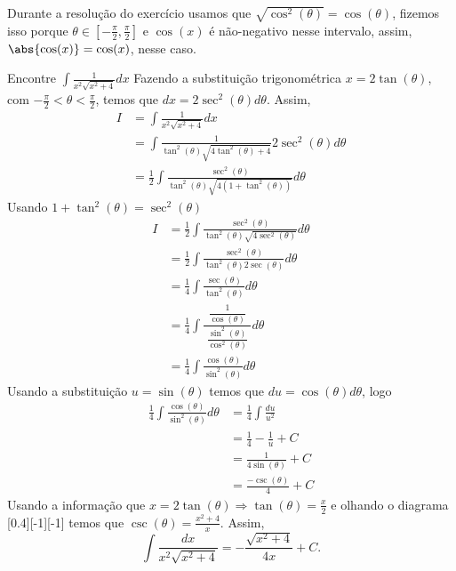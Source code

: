 Durante a resolução do exercício usamos que
\(\sqrt{\cos^2(\theta)}=\cos(\theta)\),
fizemos isso porque
\(\theta \in \left[-\frac{\pi}{2}, \frac{\pi}{2} \right]\)
e $\cos(x)$ é não-negativo nesse intervalo, assim,
$\abs{\cos(x)}= \cos(x)$, nesse caso.

\begin{example}
  Encontre \(\int \frac{1}{x^2\sqrt{x^2+4}}dx\)
  \solution
  Fazendo a substituição trigonométrica
  $x=2\tan(\theta)$, com $-\frac{\pi}{2}< \theta < \frac{\pi}{2}$,
  temos que $dx=2\sec^2(\theta)d \theta$.
  Assim,
  \begin{align*}
    I
    & = \int \frac{1}{x^2\sqrt{x^2+4}}dx \\
    & = \int \frac{1}{\tan^2(\theta) \sqrt{4\tan^2(\theta)+4}}2\sec^2(\theta) d \theta \\
    & = \frac{1}{2}\int \frac{\sec^2(\theta) }{\tan^2(\theta) \sqrt{4(1+ \tan^2(\theta))}} d\theta
  \end{align*}
  Usando \(1+\tan^2(\theta)= \sec^2(\theta)\)
  \begin{align*}
    I
    & = \frac{1}{2} \int \frac{\sec^2(\theta)}{\tan^2(\theta) \sqrt{4\sec^2(\theta)}} d \theta \\
    & = \frac{1}{2} \int \frac{\sec^2(\theta)}{\tan^2(\theta) 2\sec(\theta)}  d \theta \\
    & = \frac{1}{4} \int \frac{\sec(\theta)}{\tan^2(\theta)} d \theta \\
    & = \frac{1}{4} \int \frac{\;\;\dfrac{1}{\cos(\theta)}\;\;}{\dfrac{\sin^2(\theta)}{\cos^2(\theta)}} d\theta \\
    & = \frac{1}{4} \int \frac{\cos(\theta)}{\sin^2(\theta)} d \theta
  \end{align*}
  Usando a substituição $u=\sin(\theta)$ temos que
  $du=\cos(\theta) d\theta$, logo
  \begin{align*}
    \frac{1}{4} \int \frac{\cos(\theta)}{\sin^2(\theta)} d \theta
    & = \frac{1}{4} \int \frac{du}{u^2} \\
    & = \frac{1}{4} - \frac{1}{u}+C \\
    & = \frac{1}{4\sin(\theta)} + C \\
    & = \frac{-\csc(\theta)}{4}+ C
  \end{align*}
  Usando a informação que $x= 2 \tan(\theta) \Rightarrow \tan(\theta)= \frac{x}{2}$
  e olhando o diagrama
  [0.4][-1][-1]
  temos que $\csc(\theta)=\frac{x^2+4}{x}$.
  Assim,
  \[
    \int \frac{dx}{x^2\sqrt{x^2+4}} =- \frac{\sqrt{x^2+4}}{4x}+C.
  \]
\end{example}

